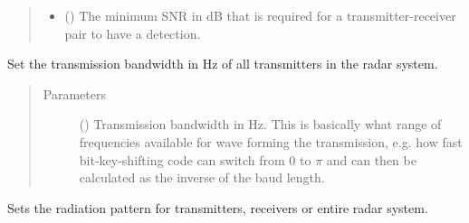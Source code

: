 \documentclass[letterpaper,10pt,english]{sphinxmanual}
\begin{document}
\begin{fulllineitems}
\begin{fulllineitems}
\begin{quote}
\begin{description}
\begin{itemize}
\item {} 
 () \textendash{} The minimum SNR in dB that is required for a transmitter-receiver pair to have a detection.

\end{itemize}

\end{description}\end{quote}

\end{fulllineitems}


\begin{fulllineitems}
\label{\detokenize{modules/radar_config:radar_config.RadarSystem.set_TX_bandwith}}
Set the transmission bandwidth in Hz of all transmitters in the radar system.
\begin{quote}\begin{description}
\item[{Parameters}] \leavevmode
{} () \textendash{} Transmission bandwidth in Hz. This is basically what range of frequencies available for wave forming the transmission, e.g. how fast bit-key-shifting code can switch from 0 to \(\pi\) and can then be calculated as the inverse of the baud length.

\end{description}\end{quote}

\end{fulllineitems}


\begin{fulllineitems}
\label{\detokenize{modules/radar_config:radar_config.RadarSystem.set_beam}}
Sets the radiation pattern for transmitters, receivers or entire radar system.


\end{fulllineitems}
\end{fulllineitems}
\end{document}
